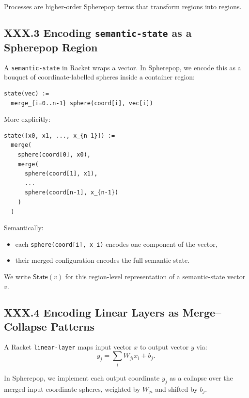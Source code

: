 \documentclass[11pt,letterpaper]{article}
\begin{document}
Processes are higher-order Spherepop terms that transform regions into regions.

\subsection{XXX.3 Encoding \texttt{semantic-state} as a Spherepop Region}

A \texttt{semantic-state} in Racket wraps a vector. In Spherepop, we encode this as a bouquet of coordinate-labelled spheres inside a container region:

\begin{verbatim}
state(vec) :=
  merge_{i=0..n-1} sphere(coord[i], vec[i])
\end{verbatim}

More explicitly:

\begin{verbatim}
state([x0, x1, ..., x_{n-1}]) :=
  merge(
    sphere(coord[0], x0),
    merge(
      sphere(coord[1], x1),
      ...
      sphere(coord[n-1], x_{n-1})
    )
  )
\end{verbatim}

Semantically:

\begin{itemize}
  \item each \verb|sphere(coord[i], x_i)| encodes one component of the vector,
  \item their merged configuration encodes the full semantic state.
\end{itemize}

We write $\mathsf{State}(v)$ for this region-level representation of a semantic-state vector $v$.

\subsection{XXX.4 Encoding Linear Layers as Merge--Collapse Patterns}

A Racket \texttt{linear-layer} maps input vector $x$ to output vector $y$ via:
\[
y_j = \sum_i W_{ji} x_i + b_j.
\]

In Spherepop, we implement each output coordinate $y_j$ as a collapse over the merged input coordinate spheres, weighted by $W_{ji}$ and shifted by $b_j$.
\end{document}
